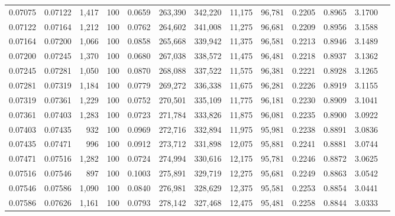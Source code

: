 \begin{tabular}{rrrrrrrrrrrrr}
0.07075 & 0.07122 & 1,417 & 100 &                                     0.0659 & 263,390 & 342,220 &  11,175 &  96,781 & 0.2205 & 0.8965 & 3.1700 \\
0.07122 & 0.07164 & 1,212 & 100 &                                     0.0762 & 264,602 & 341,008 &  11,275 &  96,681 & 0.2209 & 0.8956 & 3.1588 \\
0.07164 & 0.07200 & 1,066 & 100 &                                     0.0858 & 265,668 & 339,942 &  11,375 &  96,581 & 0.2213 & 0.8946 & 3.1489 \\
0.07200 & 0.07245 & 1,370 & 100 &                                     0.0680 & 267,038 & 338,572 &  11,475 &  96,481 & 0.2218 & 0.8937 & 3.1362 \\
0.07245 & 0.07281 & 1,050 & 100 &                                     0.0870 & 268,088 & 337,522 &  11,575 &  96,381 & 0.2221 & 0.8928 & 3.1265 \\
0.07281 & 0.07319 & 1,184 & 100 &                                     0.0779 & 269,272 & 336,338 &  11,675 &  96,281 & 0.2226 & 0.8919 & 3.1155 \\
0.07319 & 0.07361 & 1,229 & 100 &                                     0.0752 & 270,501 & 335,109 &  11,775 &  96,181 & 0.2230 & 0.8909 & 3.1041 \\
0.07361 & 0.07403 & 1,283 & 100 &                                     0.0723 & 271,784 & 333,826 &  11,875 &  96,081 & 0.2235 & 0.8900 & 3.0922 \\
0.07403 & 0.07435 &   932 & 100 &                                     0.0969 & 272,716 & 332,894 &  11,975 &  95,981 & 0.2238 & 0.8891 & 3.0836 \\
0.07435 & 0.07471 &   996 & 100 &                                     0.0912 & 273,712 & 331,898 &  12,075 &  95,881 & 0.2241 & 0.8881 & 3.0744 \\
0.07471 & 0.07516 & 1,282 & 100 &                                     0.0724 & 274,994 & 330,616 &  12,175 &  95,781 & 0.2246 & 0.8872 & 3.0625 \\
0.07516 & 0.07546 &   897 & 100 &                                     0.1003 & 275,891 & 329,719 &  12,275 &  95,681 & 0.2249 & 0.8863 & 3.0542 \\
0.07546 & 0.07586 & 1,090 & 100 &                                     0.0840 & 276,981 & 328,629 &  12,375 &  95,581 & 0.2253 & 0.8854 & 3.0441 \\
0.07586 & 0.07626 & 1,161 & 100 &                                     0.0793 & 278,142 & 327,468 &  12,475 &  95,481 & 0.2258 & 0.8844 & 3.0333 \\

\end{tabular}

